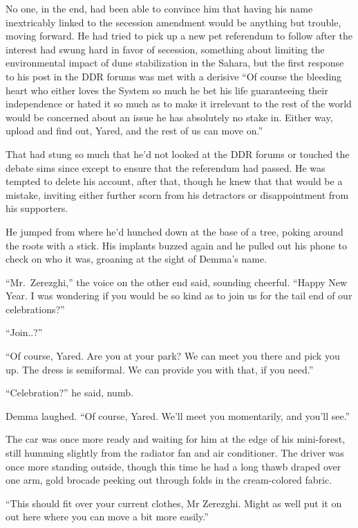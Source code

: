 No one, in the end, had been able to convince him that having his name inextricably linked to the secession amendment would be anything but trouble, moving forward. He had tried to pick up a new pet referendum to follow after the interest had swung hard in favor of secession, something about limiting the environmental impact of dune stabilization in the Sahara, but the first response to his post in the DDR forums was met with a derisive ``Of course the bleeding heart who either loves the System so much he bet his life guaranteeing their independence or hated it so much as to make it irrelevant to the rest of the world would be concerned about an issue he has absolutely no stake in. Either way, upload and find out, Yared, and the rest of us can move on.''

That had stung so much that he'd not looked at the DDR forums or touched the debate sims since except to ensure that the referendum had passed. He was tempted to delete his account, after that, though he knew that that would be a mistake, inviting either further scorn from his detractors or disappointment from his supporters.

He jumped from where he'd hunched down at the base of a tree, poking around the roots with a stick. His implants buzzed again and he pulled out his phone to check on who it was, groaning at the sight of Demma's name.

``Mr.~Zerezghi,'' the voice on the other end said, sounding cheerful. ``Happy New Year. I was wondering if you would be so kind as to join us for the tail end of our celebrations?''

``Join..?''

``Of course, Yared. Are you at your park? We can meet you there and pick you up. The dress is semiformal. We can provide you with that, if you need.''

``Celebration?'' he said, numb.

Demma laughed. ``Of course, Yared. We'll meet you momentarily, and you'll see.''

The car was once more ready and waiting for him at the edge of his mini-forest, still humming slightly from the radiator fan and air conditioner. The driver was once more standing outside, though this time he had a long thawb draped over one arm, gold brocade peeking out through folds in the cream-colored fabric.

``This should fit over your current clothes, Mr Zerezghi. Might as well put it on out here where you can move a bit more easily.''

